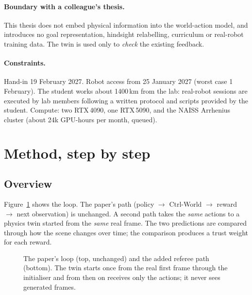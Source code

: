 \paragraph{Boundary with a colleague's thesis.} This thesis does not embed physical information into the world-action model, and introduces no goal representation, hindsight relabelling, curriculum or real-robot training data. The twin is used only to \emph{check} the existing feedback.

\paragraph{Constraints.} Hand-in 19 February 2027. Robot access from 25 January 2027 (worst case 1 February). The student works about 1400\,km from the lab: real-robot sessions are executed by lab members following a written protocol and scripts provided by the student. Compute: two RTX\,4090, one RTX\,5090, and the NAISS Arrhenius cluster (about 24k GPU-hours per month, queued).

\section{Method, step by step}\label{method:sec:method}
\renewcommand{\thesubsection}{Step~\arabic{subsection}}
\renewcommand{\thesubsubsection}{\arabic{subsection}.\arabic{subsubsection}}

\subsection*{Overview}
Figure~\ref{method:fig:pipeline} shows the loop. The paper's path (policy $\to$ Ctrl-World $\to$ reward $\to$ next observation) is unchanged. A second path takes the \emph{same} actions to a physics twin started from the \emph{same} real frame. The two predictions are compared through how the scene changes over time; the comparison produces a trust weight for each reward.

\begin{figure}[h]
\centering

\caption{The paper's loop (top, unchanged) and the added referee path (bottom). The twin starts once from the real first frame through the initialiser and from then on receives only the actions; it never sees generated frames.}
\label{method:fig:pipeline}
\end{figure}

